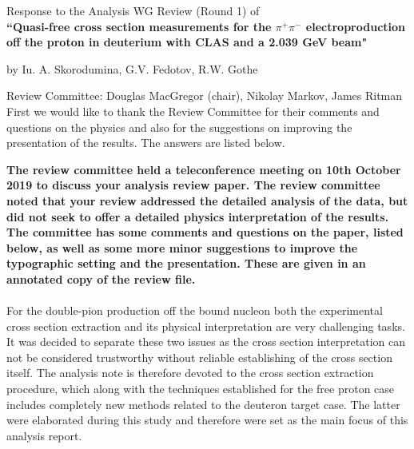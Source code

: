 \documentclass[,superscriptaddress,showpacs,amssymb,amsmath,amsfonts,linenumbers,article]{revtex4-1}
\begin{document}
\begin{center}
\vspace{2cm}
{\LARGE Response to the Analysis WG Review (Round 1) of}\\[0.7cm] 

{\bf \large
 ``Quasi-free cross section measurements for the $\pi^{+}\pi^{-}$ electroproduction off the proton in deuterium with CLAS and a 2.039 GeV beam"\\[0.25cm]}

by Iu. A. Skorodumina, G.V. Fedotov, R.W. Gothe\\[1cm]
\end{center}


{\large Review Committee: Douglas MacGregor (chair), Nikolay Markov, James Ritman} \\[1.5cm] 

\vspace{0.25cm}
First we would like to thank the Review Committee for their comments and questions on the physics and also for the suggestions on improving the presentation of the results. The answers are listed below.

\vspace{0.75cm}
 
{\bf The review committee held a teleconference meeting on 10th October 2019 to discuss your analysis review paper. The review committee noted that your review addressed the detailed analysis of the data, but did not seek to offer a detailed physics interpretation of the results. The committee has some comments and questions on the paper, listed below, as well as some more minor suggestions to improve the typographic setting and the presentation. These are given in an annotated copy of the review file.}\\ \\


For the double-pion production off the bound nucleon both the experimental cross section extraction and its physical interpretation are very challenging tasks. It was decided to separate these two issues as the cross section interpretation can not be considered trustworthy without reliable establishing of the cross section itself. The analysis note is therefore devoted to the cross section extraction procedure, which along with the techniques established for the free proton case includes completely new methods related to the deuteron target case. The latter were elaborated during this study and therefore were set as the main focus of this analysis report.\\
\end{document}
